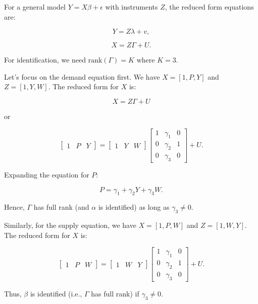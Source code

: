 \documentclass{article}
\begin{document}
For a general model \( Y = X\beta + \epsilon \) with instruments \( Z \), the reduced form equations are:

\[
Y = Z\lambda + v,
\]

\[
X = Z\Gamma + U.
\]

For identification, we need \( \text{rank}(\Gamma) = K \) where \( K = 3 \).

Let's focus on the demand equation first. We have \( X = [1, P, Y] \) and \( Z = [1, Y, W] \). The reduced form for \( X \) is:

\[
X = Z\Gamma + U
\]

or

\[
\begin{bmatrix} 1 & P & Y \end{bmatrix} = \begin{bmatrix} 1 & Y & W \end{bmatrix}
\begin{bmatrix} 
1 & \gamma_1 & 0 \\ 
0 & \gamma_2 & 1 \\ 
0 & \gamma_3 & 0 
\end{bmatrix} + U.
\]

Expanding the equation for \( P \):

\[
P = \gamma_1 + \gamma_2 Y + \gamma_3 W.
\]

Hence, \( \Gamma \) has full rank (and \( \alpha \) is identified) as long as \( \gamma_3 \neq 0 \).

Similarly, for the supply equation, we have \( X = [1, P, W] \) and \( Z = [1, W, Y] \). The reduced form for \( X \) is:

\[
\begin{bmatrix} 1 & P & W \end{bmatrix} = \begin{bmatrix} 1 & W & Y \end{bmatrix}
\begin{bmatrix} 
1 & \gamma_1 & 0 \\ 
0 & \gamma_2 & 1 \\ 
0 & \gamma_3 & 0 
\end{bmatrix} + U.
\]

Thus, \( \beta \) is identified (i.e., \( \Gamma \) has full rank) if \( \gamma_3 \neq 0 \).
\end{document}
